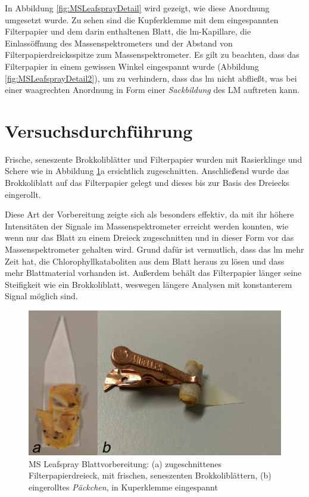 In Abbildung \ref{fig:MSLeafsprayDetail} wird gezeigt, wie diese Anordnung umgesetzt wurde. Zu sehen sind die Kupferklemme mit dem eingespannten Filterpapier und dem darin enthaltenen Blatt, die \gls{lm}-Kapillare, die Einlassöffnung des Massenspektrometers und der Abstand von Filterpapierdreicksspitze zum Massenspektrometer. Es gilt zu beachten, dass das Filterpapier in einem gewissen Winkel eingespannt wurde (Abbildung \ref{fig:MSLeafsprayDetail2}), um zu verhindern, dass das \gls{lm} nicht abfließt, was bei einer waagrechten Anordnung in Form einer \textit{Sackbildung} des LM auftreten kann.

\pagebreak
\section{Versuchsdurchführung} \label{sec:Versuchsdurchfuehrung}

Frische, seneszente Brokkoliblätter und Filterpapier wurden mit Rasierklinge und Schere wie in Abbildung \ref{fig:LeafsprayVorbereitung}a ersichtlich zugeschnitten. Anschließend wurde das Brokkoliblatt auf das Filterpapier gelegt und dieses bis zur Basis des Dreiecks eingerollt. 

Diese Art der Vorbereitung zeigte sich als besonders effektiv, da mit ihr höhere Intensitäten der Signale im Massenspektrometer erreicht werden konnten, wie wenn nur das Blatt zu einem Dreieck zugeschnitten und in dieser Form vor das Massenspektrometer gehalten wird. Grund dafür ist vermutlich, dass das \gls{lm} mehr Zeit hat, die Chlorophyllkataboliten aus dem Blatt heraus zu lösen und dass mehr Blattmaterial vorhanden ist. Außerdem behält das Filterpapier länger seine Steifigkeit wie ein Brokkoliblatt, weswegen längere Analysen mit konstanterem Signal möglich sind.

\begin{figure}[hbtp]
  \centering
  \includegraphics[scale=0.5]{figures/Kapitel4/VWA_MSLeafspray_Blattvobereitung_zwei.png}
  \caption[MS Leafspray Blattvorbereitung, Quelle: Autor]{MS Leafspray Blattvorbereitung: (a) zugeschnittenes Filterpapierdreieck, mit frischen, seneszenten Brokkoliblättern, (b) eingerolltes \textit{Päckchen}, in Kuperklemme eingespannt}
  \label{fig:LeafsprayVorbereitung}
\end{figure}


